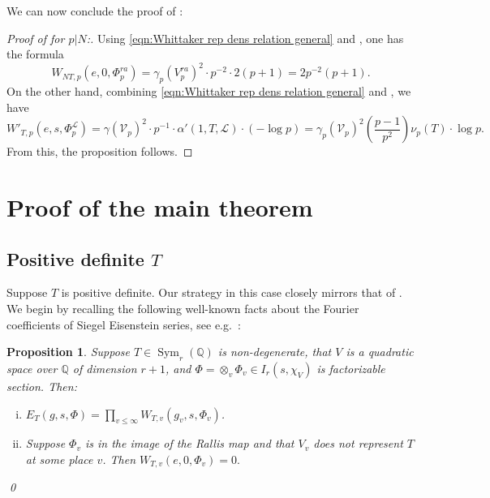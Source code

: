 \documentclass[reqno,oneside]{amsart}
\theoremstyle{plain}
\newtheorem{proposition}[theorem]{Proposition}
\theoremstyle{remark}
\numberwithin{theorem}{section}
\newcommand{\bbQ}{\mathbb Q}
\newcommand{\calL}{\mathcal L}
\newcommand{\calV}{\mathcal V}
\DeclareMathOperator{\Sym}{Sym}
\begin{document}
	We can now conclude the proof of :
	
	\begin{proof}[Proof of  for $p|N$:]
		Using \eqref{eqn:Whittaker rep dens relation general} and \cite[Proposition 8.7]{YangLocal}, one has the formula
		\begin{equation}
		W_{NT,p}(e, 0, \Phi_p^{ra}) = \gamma_p(V_p^{ra})^2 \cdot p^{-2} \cdot 2(p+1) =2  p^{-2} (p+1).
		\end{equation}
		On the other hand, combining \eqref{eqn:Whittaker rep dens relation general} and , we have
		\begin{equation}
		W'_{T, p}(e, s, \Phi^{\calL}_p) = \gamma(\calV_p)^2 \cdot p^{-1} \cdot \alpha'(1, T, \calL) \cdot (-\log p) =   \gamma_p(\calV_p)^2 \left( \frac{p-1}{p^2}  \right) \nu_p(T) \cdot \log p.
		\end{equation}
		From this, the proposition follows.
	\end{proof}
	
	
	\section{Proof of the main theorem} \label{sec:proof of main thm}
	\subsection{Positive definite $T$}
	
	Suppose $T$ is positive definite.	Our strategy in this case closely mirrors that of \cite{KRYbook}. We begin by recalling the following well-known facts about the Fourier coefficients of Siegel Eisenstein series, see e.g.\ \cite[\S 1]{KudlaCentralDerivs}:
	\begin{proposition} \label{prop:Whittaker dichotomy}
		Suppose $T \in \Sym_r(\bbQ)$ is non-degenerate, that $V$ is a quadratic space over $\bbQ$ of dimension $r+1$, and $\Phi = \otimes_v \Phi_v \in I_r(s, \chi_{V})$ is factorizable section. Then:
		\begin{enumerate}[(i)]
			\item $E_T(g, s, \Phi) = \prod_{v \leq \infty} W_{T,v}(g_v, s, \Phi_v)$.
			\item Suppose $\Phi_v$ is in the image of the Rallis map and that $V_v$ does not represent $T$ at some place $v$. Then $	W_{T,v}(e, 0, \Phi_v) = 0.$
		\end{enumerate}
		\qed
	\end{proposition}
	
\end{document}
